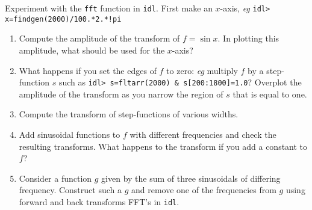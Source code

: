 Experiment with the {\tt fft} function in {\tt idl}. First make an $x$-axis, 
{\it eg} {\tt idl> x=findgen(2000)/100.*2.*!pi}
\begin{enumerate}
\item Compute the amplitude of the transform of $f=\sin x$. In plotting this 
amplitude, what should be used for the $x$-axis?
\item What happens if you set the edges of $f$ to zero: {\it eg} multiply $f$
by a step-function $s$ such as {\tt idl> s=fltarr(2000) \& s[200:1800]=1.0}? 
Overplot the amplitude of the transform as you narrow the region of $s$ that is
equal to one.
\item Compute the transform of step-functions of various widths.
\item Add sinusoidal functions to $f$ with different frequencies and check the
resulting transforms. What happens to the transform if you add a constant to 
$f$? 
\item Consider a function $g$ given by the sum of three sinusoidals of differing
frequency. Construct such a $g$ and remove one of the frequencies from $g$ using 
forward and back transforms FFT's in {\tt idl}.
\end{enumerate}

%
